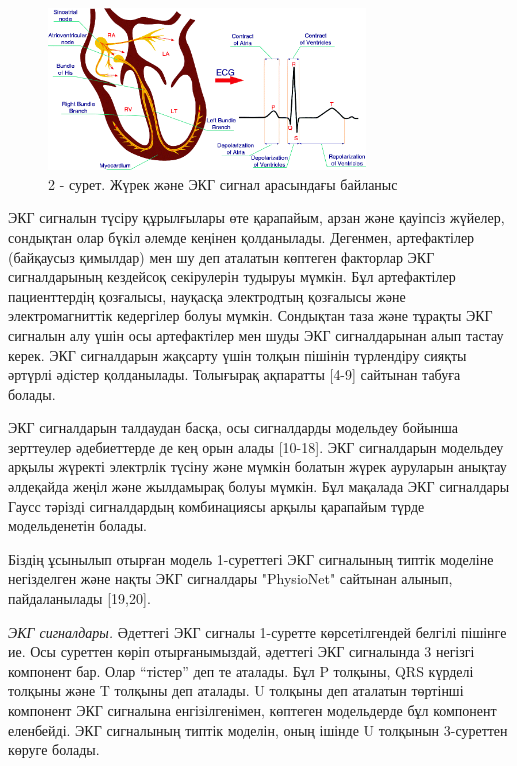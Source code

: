 \begin{figure}[H]
	\centering
	\includegraphics[width=0.75\textwidth]{media/ict/image41}
	\caption*{2 - сурет. Жүрек және ЭКГ сигнал арасындағы байланыс}
\end{figure}

\begin{multicols}{2}
ЭКГ сигналын түсіру құрылғылары өте қарапайым, арзан және қауіпсіз
жүйелер, сондықтан олар бүкіл әлемде кеңінен қолданылады. Дегенмен,
артефактілер (байқаусыз қимылдар) мен шу деп аталатын көптеген факторлар
ЭКГ сигналдарының кездейсоқ секірулерін тудыруы мүмкін. Бұл артефактілер
пациенттердің қозғалысы, науқасқа электродтың қозғалысы және
электромагниттік кедергілер болуы мүмкін. Сондықтан таза және тұрақты
ЭКГ сигналын алу үшін осы артефактілер мен шуды ЭКГ сигналдарынан алып
тастау керек. ЭКГ сигналдарын жақсарту үшін толқын пішінін түрлендіру
сияқты әртүрлі әдістер қолданылады. Толығырақ ақпаратты {[}4-9{]}
сайтынан табуға болады.

ЭКГ сигналдарын талдаудан басқа, осы сигналдарды модельдеу бойынша
зерттеулер әдебиеттерде де кең орын алады {[}10-18{]}. ЭКГ сигналдарын
модельдеу арқылы жүректі электрлік түсіну және мүмкін болатын жүрек
ауруларын анықтау әлдеқайда жеңіл және жылдамырақ болуы мүмкін. Бұл
мақалада ЭКГ сигналдары Гаусс тәрізді сигналдардың комбинациясы арқылы
қарапайым түрде модельденетін болады.

Біздің ұсынылып отырған модель 1-суреттегі ЭКГ сигналының типтік
моделіне негізделген және нақты ЭКГ сигналдары "PhysioNet" сайтынан
алынып, пайдаланылады {[}19,20{]}.

 \emph{ЭКГ сигналдары.} Әдеттегі ЭКГ
сигналы 1-суретте көрсетілгендей белгілі пішінге ие. Осы суреттен көріп
отырғанымыздай, әдеттегі ЭКГ сигналында 3 негізгі компонент бар. Олар
``тістер'' деп те аталады. Бұл P толқыны, QRS күрделі толқыны және T
толқыны деп аталады. U толқыны деп аталатын төртінші компонент ЭКГ
сигналына енгізілгенімен, көптеген модельдерде бұл компонент еленбейді.
ЭКГ сигналының типтік моделін, оның ішінде U толқынын 3-суреттен көруге
болады.
\end{multicols}

